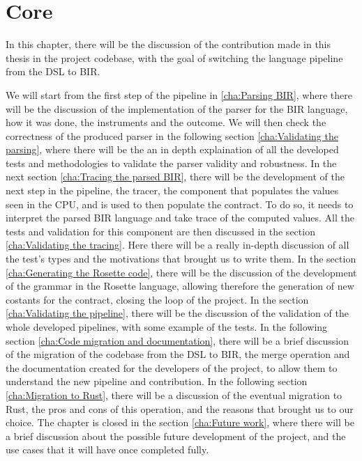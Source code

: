 \chapter{Core}
\label{cha:core} In this chapter, there will be the discussion of the
contribution made in this thesis in the project codebase, with the goal of switching
the language pipeline from the DSL to BIR.

We will start from the first step of the pipeline in \ref{cha:Parsing BIR},
where there will be the discussion of the implementation of the parser for the
BIR language, how it was done, the instruments and the outcome. We will then check
the correctness of the produced parser in the following section \ref{cha:Validating
the parsing}, where there will be the an in depth explaination of all the
developed tests and methodologies to validate the parser validity and robustness.
In the next section \ref{cha:Tracing the parsed BIR}, there will be the
development of the next step in the pipeline, the tracer, the component that
populates the values seen in the CPU, and is used to then populate the contract.
To do so, it needs to interpret the parsed BIR language and take trace of the computed
values. All the tests and validation for this component are then discussed in
the section \ref{cha:Validating the tracing}. Here there will be a really in-depth
discussion of all the test's types and the motivations that brought us to write them.
In the section \ref{cha:Generating the Rosette code}, there will be the discussion
of the development of the grammar in the Rosette language, allowing therefore
the generation of new costants for the contract, closing the loop of the project.
In the section \ref{cha:Validating the pipeline}, there will be the discussion of
the validation of the whole developed pipelines, with some example of the tests.
In the following section \ref{cha:Code migration and documentation}, there will
be a brief discussion of the migration of the codebase from the DSL to BIR, the merge
operation and the documentation created for the developers of the project, to
allow them to understand the new pipeline and contribution. In the following section
\ref{cha:Migration to Rust}, there will be a discussion of the eventual
migration to Rust, the pros and cons of this operation, and the reasons that
brought us to our choice. The chapter is closed in the section \ref{cha:Future
work}, where there will be a brief discussion about the possible future
development of the project, and the use cases that it will have once completed fully.

